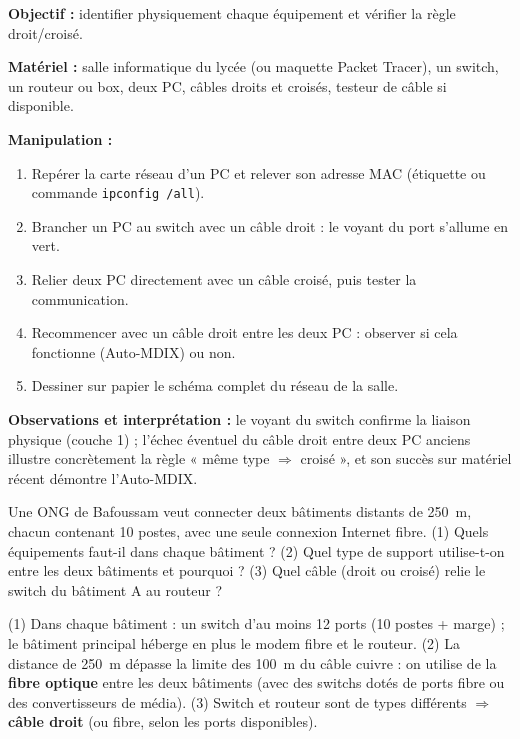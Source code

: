 \documentclass[11pt]{article}
\begin{document}
\begin{experience}
\textbf{Objectif :} identifier physiquement chaque équipement et vérifier la règle droit/croisé.

\textbf{Matériel :} salle informatique du lycée (ou maquette Packet Tracer), un switch, un routeur ou box, deux PC, câbles droits et croisés, testeur de câble si disponible.

\textbf{Manipulation :}
\begin{enumerate}
  \item Repérer la carte réseau d'un PC et relever son adresse MAC (étiquette ou commande \texttt{ipconfig /all}).
  \item Brancher un PC au switch avec un câble droit : le voyant du port s'allume en vert.
  \item Relier deux PC directement avec un câble croisé, puis tester la communication.
  \item Recommencer avec un câble droit entre les deux PC : observer si cela fonctionne (Auto-MDIX) ou non.
  \item Dessiner sur papier le schéma complet du réseau de la salle.
\end{enumerate}

\textbf{Observations et interprétation :} le voyant du switch confirme la liaison physique (couche 1) ; l'échec éventuel du câble droit entre deux PC anciens illustre concrètement la règle « même type $\Rightarrow$ croisé », et son succès sur matériel récent démontre l'Auto-MDIX.
\end{experience}

\begin{exercice}
Une ONG de Bafoussam veut connecter deux bâtiments distants de \SI{250}{\metre}, chacun contenant 10 postes, avec une seule connexion Internet fibre. (1) Quels équipements faut-il dans chaque bâtiment ? (2) Quel type de support utilise-t-on entre les deux bâtiments et pourquoi ? (3) Quel câble (droit ou croisé) relie le switch du bâtiment A au routeur ?
\end{exercice}

\begin{corrige}[Exercice 1]
(1) Dans chaque bâtiment : un switch d'au moins 12 ports (10 postes + marge) ; le bâtiment principal héberge en plus le modem fibre et le routeur. (2) La distance de \SI{250}{\metre} dépasse la limite des \SI{100}{\metre} du câble cuivre : on utilise de la \textbf{fibre optique} entre les deux bâtiments (avec des switchs dotés de ports fibre ou des convertisseurs de média). (3) Switch et routeur sont de types différents $\Rightarrow$ \textbf{câble droit} (ou fibre, selon les ports disponibles).
\end{corrige}
\end{document}
